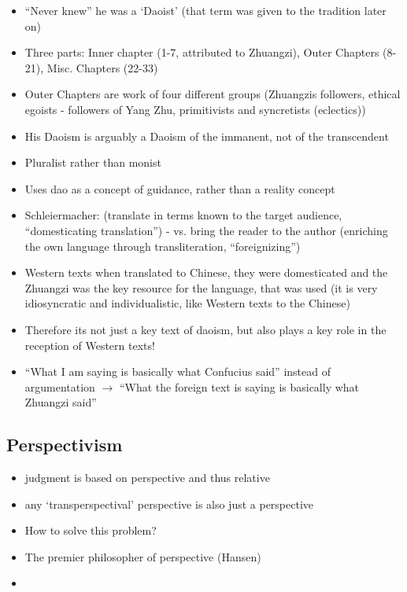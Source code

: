 \documentclass[emulatestandardclasses]{scrartcl}
\begin{document}
\begin{itemize}
  \item "`Never knew"' he was a `Daoist' (that term was given to the tradition later on)
  \item Three parts: Inner chapter (1-7, attributed to Zhuangzi), Outer Chapters (8-21), Misc. Chapters (22-33)
  \item Outer Chapters are work of four different groups (Zhuangzis followers, ethical egoists - followers of Yang Zhu, primitivists and syncretists (eclectics))
  \item His Daoism is arguably a Daoism of the immanent, not of the transcendent
  \item Pluralist rather than monist
  \item Uses dao as a concept of guidance, rather than a reality concept
  \item Schleiermacher: (translate in terms known to the target audience, "`domesticating translation"') - vs. bring the reader to the author (enriching the own language through transliteration, "`foreignizing"')
  \item Western texts when translated to Chinese, they were domesticated and the Zhuangzi was the key resource for the language, that was used (it is very idiosyncratic and individualistic, like Western texts to the Chinese)
  \item Therefore its not just a key text of daoism, but also plays a key role in the reception of Western texts!
  \item "`What I am saying is basically what Confucius said"' instead of argumentation $\rightarrow$ "`What the foreign text is saying is basically what Zhuangzi said"'
\end{itemize}

\subsection{Perspectivism}


\begin{itemize}
  \item judgment is based on perspective and thus relative
  \item any `transperspectival' perspective is also just a perspective
  \item How to solve this problem?
  \item The premier philosopher of perspective (Hansen)
  \item 
\end{itemize}
\end{document}
